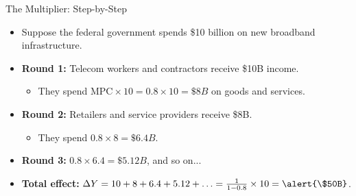 \documentclass[aspectratio=169]{beamer}
\begin{document}
\begin{frame}{The Multiplier: Step-by-Step}
\transfade
\begin{itemize}[<+->]
  \item Suppose the federal government spends \alert{\$10 billion} on new broadband infrastructure.
  \item \textbf{Round 1:} Telecom workers and contractors receive \$10B income.
  \begin{itemize}[<+->]
    \item They spend $\text{MPC} \times 10 = 0.8 \times 10 = \$8B$ on goods and services.
  \end{itemize}
  \item \textbf{Round 2:} Retailers and service providers receive \$8B.
  \begin{itemize}[<+->]
    \item They spend $0.8 \times 8 = \$6.4B$.
  \end{itemize}
  \item \textbf{Round 3:} $0.8 \times 6.4 = \$5.12B$, and so on...
  \item \textbf{Total effect:} $\Delta Y = 10 + 8 + 6.4 + 5.12 + \ldots = \frac{1}{1-0.8} \times 10 = \alert{\$50B}$.
\end{itemize}
\end{frame}
\end{document}
